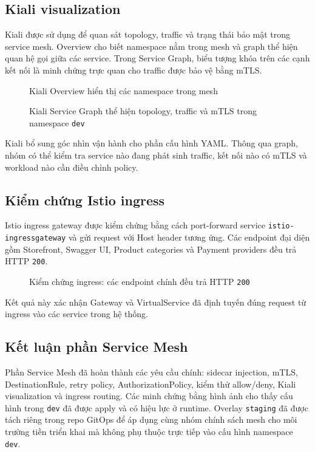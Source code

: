 \subsection{Kiali visualization}

Kiali được sử dụng để quan sát topology, traffic và trạng thái bảo mật trong service mesh. Overview cho biết namespace nằm trong mesh và graph thể hiện quan hệ gọi giữa các service. Trong Service Graph, biểu tượng khóa trên các cạnh kết nối là minh chứng trực quan cho traffic được bảo vệ bằng mTLS.

\begin{figure}[H]
\centering
{}
\caption{Kiali Overview hiển thị các namespace trong mesh}
\end{figure}

\begin{figure}[H]
\centering
{}
\caption{Kiali Service Graph thể hiện topology, traffic và mTLS trong namespace \texttt{dev}}
\end{figure}

Kiali bổ sung góc nhìn vận hành cho phần cấu hình YAML. Thông qua graph, nhóm có thể kiểm tra service nào đang phát sinh traffic, kết nối nào có mTLS và workload nào cần điều chỉnh policy.

\subsection{Kiểm chứng Istio ingress}

Istio ingress gateway được kiểm chứng bằng cách port-forward service \texttt{istio-ingressgateway} và gửi request với Host header tương ứng. Các endpoint đại diện gồm Storefront, Swagger UI, Product categories và Payment providers đều trả HTTP \texttt{200}.

\begin{figure}[H]
\centering
{}
\caption{Kiểm chứng ingress: các endpoint chính đều trả HTTP \texttt{200}}
\end{figure}

Kết quả này xác nhận Gateway và VirtualService đã định tuyến đúng request từ ingress vào các service trong hệ thống.

\subsection{Kết luận phần Service Mesh}

Phần Service Mesh đã hoàn thành các yêu cầu chính: sidecar injection, mTLS, DestinationRule, retry policy, AuthorizationPolicy, kiểm thử allow/deny, Kiali visualization và ingress routing. Các minh chứng bằng hình ảnh cho thấy cấu hình trong \texttt{dev} đã được apply và có hiệu lực ở runtime. Overlay \texttt{staging} đã được tách riêng trong repo GitOps để áp dụng cùng nhóm chính sách mesh cho môi trường tiền triển khai mà không phụ thuộc trực tiếp vào cấu hình namespace \texttt{dev}.
